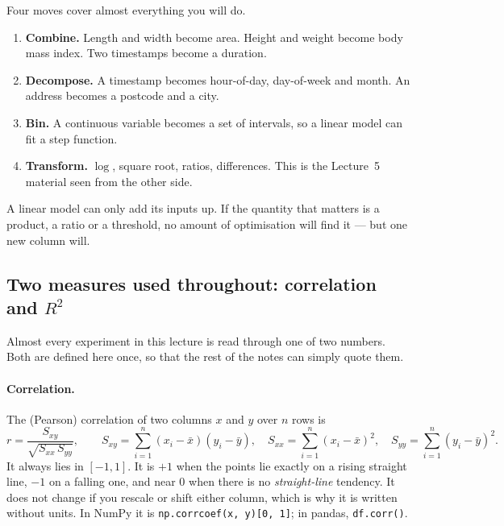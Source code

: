 \documentclass[11pt]{article}
\begin{document}
Four moves cover almost everything you will do.

\begin{enumerate}[leftmargin=*]
  \item \textbf{Combine.} Length and width become area. Height and weight
    become body mass index. Two timestamps become a duration.
  \item \textbf{Decompose.} A timestamp becomes hour-of-day, day-of-week and
    month. An address becomes a postcode and a city.
  \item \textbf{Bin.} A continuous variable becomes a set of intervals, so a
    linear model can fit a step function.
  \item \textbf{Transform.} $\log$, square root, ratios, differences. This is
    the Lecture~5 material seen from the other side.
\end{enumerate}

\begin{keyidea}
A linear model can only add its inputs up. If the quantity that matters is a
product, a ratio or a threshold, no amount of optimisation will find it --- but
one new column will.
\end{keyidea}

\subsection{Two measures used throughout: correlation and $R^2$}
\label{sec:r2corr}

Almost every experiment in this lecture is read through one of two numbers.
Both are defined here once, so that the rest of the notes can simply quote
them.

\paragraph{Correlation.} The (Pearson) correlation of two columns $x$ and $y$
over $n$ rows is
\begin{equation}
  r = \frac{S_{xy}}{\sqrt{S_{xx}\,S_{yy}}}, \qquad
  S_{xy} = \sum_{i=1}^{n} (x_i - \bar x)(y_i - \bar y), \quad
  S_{xx} = \sum_{i=1}^{n} (x_i - \bar x)^2, \quad
  S_{yy} = \sum_{i=1}^{n} (y_i - \bar y)^2 .
  \label{eq:corr}
\end{equation}
It always lies in $[-1, 1]$. It is $+1$ when the points lie exactly on a
rising straight line, $-1$ on a falling one, and near $0$ when there is no
\emph{straight-line} tendency. It does not change if you rescale or shift
either column, which is why it is written without units. In NumPy it is
\texttt{np.corrcoef(x, y)[0, 1]}; in pandas, \texttt{df.corr()}.
\end{document}
